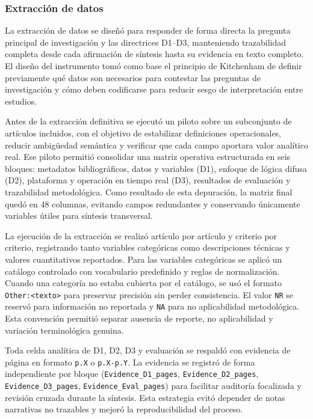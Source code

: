 \subsubsection{Extracción de datos}

La extracción de datos se diseñó para responder de forma directa la pregunta principal de investigación y las directrices D1--D3, manteniendo trazabilidad completa desde cada afirmación de síntesis hasta su evidencia en texto completo. El diseño del instrumento tomó como base el principio de Kitchenham de definir previamente qué datos son necesarios para contestar las preguntas de investigación y cómo deben codificarse para reducir sesgo de interpretación entre estudios.

Antes de la extracción definitiva se ejecutó un piloto sobre un subconjunto de artículos incluidos, con el objetivo de estabilizar definiciones operacionales, reducir ambigüedad semántica y verificar que cada campo aportara valor analítico real. Ese piloto permitió consolidar una matriz operativa estructurada en seis bloques: metadatos bibliográficos, datos y variables (D1), enfoque de lógica difusa (D2), plataforma y operación en tiempo real (D3), resultados de evaluación y trazabilidad metodológica. Como resultado de esta depuración, la matriz final quedó en 48 columnas, evitando campos redundantes y conservando únicamente variables útiles para síntesis transversal.

La ejecución de la extracción se realizó artículo por artículo y criterio por criterio, registrando tanto variables categóricas como descripciones técnicas y valores cuantitativos reportados. Para las variables categóricas se aplicó un catálogo controlado con vocabulario predefinido y reglas de normalización. Cuando una categoría no estaba cubierta por el catálogo, se usó el formato \texttt{Other:<texto>} para preservar precisión sin perder consistencia. El valor \texttt{NR} se reservó para información no reportada y \texttt{NA} para no aplicabilidad metodológica. Esta convención permitió separar ausencia de reporte, no aplicabilidad y variación terminológica genuina.

Toda celda analítica de D1, D2, D3 y evaluación se respaldó con evidencia de página en formato \texttt{p.X} o \texttt{p.X-p.Y}. La evidencia se registró de forma independiente por bloque (\texttt{Evidence\_D1\_pages}, \texttt{Evidence\_D2\_pages}, \texttt{Evidence\_D3\_pages}, \texttt{Evidence\_Eval\_pages}) para facilitar auditoría focalizada y revisión cruzada durante la síntesis. Esta estrategia evitó depender de notas narrativas no trazables y mejoró la reproducibilidad del proceso.

